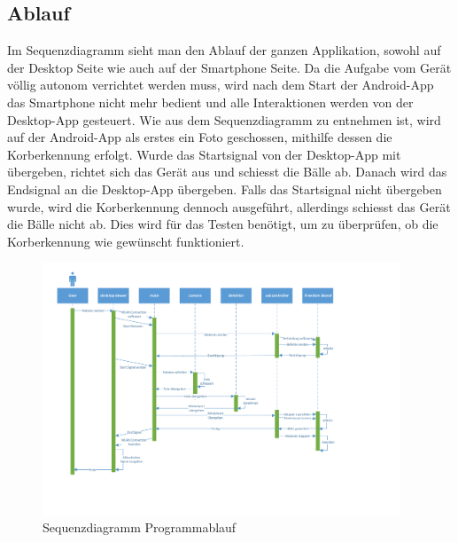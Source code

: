 \subsection{Ablauf}

Im Sequenzdiagramm sieht man den Ablauf der ganzen Applikation, sowohl auf der Desktop 
Seite wie auch auf der Smartphone Seite. Da die Aufgabe vom Gerät völlig autonom verrichtet 
werden muss, wird nach dem Start der Android-App das Smartphone nicht mehr bedient 
und alle Interaktionen werden von der Desktop-App gesteuert. 
Wie aus dem Sequenzdiagramm zu entnehmen ist, wird auf der Android-App als erstes ein 
Foto geschossen, mithilfe dessen die Korberkennung erfolgt. 
\newline
Wurde das Startsignal von der Desktop-App mit übergeben, richtet sich das Gerät aus und schiesst die Bälle ab. 
Danach wird das Endsignal an die Desktop-App übergeben.
Falls das Startsignal nicht übergeben wurde, wird die Korberkennung dennoch ausgeführt, 
allerdings schiesst das Gerät die Bälle nicht ab. Dies wird für das Testen benötigt, um 
zu überprüfen, ob die Korberkennung wie gewünscht funktioniert.


\begin{figure}[h!]
	\includegraphics[width=0.95\textwidth,clip,trim=12mm 35mm 55mm 5mm]
	{Enddokumentation/Bilder/Sequenzdiagramm_PREN2_v1.pdf}
	\centering
	\caption{Sequenzdiagramm Programmablauf}
	\label{abb:SequenzdiagrammSoftware}
\end{figure}


            
